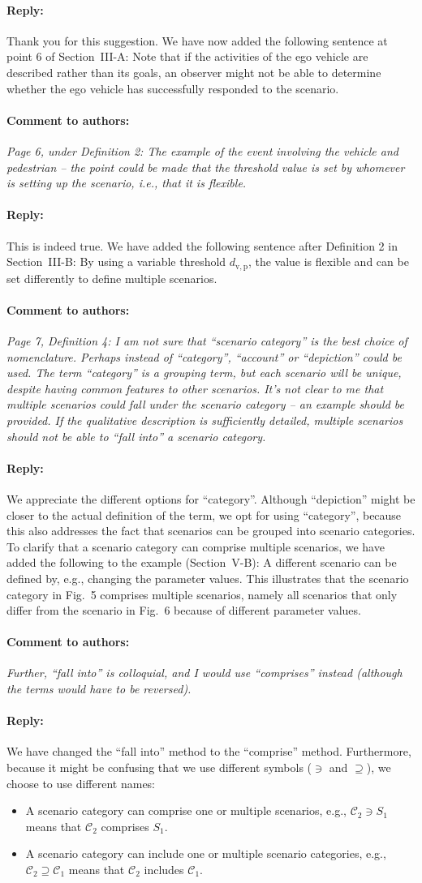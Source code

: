 \documentclass[10pt,final,a4paper,oneside,onecolumn]{article}
\newcommand{\toauthor}{\paragraph*{Comment to authors:} \itshape}
\newcommand{\fromauthor}{\paragraph*{Reply:} \normalfont}
\newcommand{\cstart}{\cbstart\color{red}}
\newcommand{\cend}{\cbend\color{black}}
\newcommand{\distancecondition}{d_{\mathrm{v,p}}}
\newcommand{\scenario}{S}
\newcommand{\scenarioa}{\scenario_{1}}
\newcommand{\comprises}{\ni}
\newcommand{\scenariocategory}{\mathcal{C}}
\newcommand{\scenariocategorya}{\scenariocategory_{1}}
\newcommand{\scenariocategoryb}{\scenariocategory_{2}}
\newcommand{\includes}{\supseteq}
\begin{document}
\fromauthor Thank you for this suggestion. We have now added the following sentence at point 6 of Section~III-A: \cstart Note that if the activities of the ego vehicle are described rather than its goals, an observer might not be able to determine whether the ego vehicle has successfully responded to the scenario.\cend



\toauthor Page 6, under Definition 2: The example of the event involving the vehicle and pedestrian -- the point could be made that the threshold value is set by whomever is setting up the scenario, i.e., that it is flexible.

\fromauthor This is indeed true. We have added the following sentence after Definition 2 in Section~III-B: \cstart By using a variable threshold $\distancecondition$, the value is flexible and can be set differently to define multiple scenarios.\cend



\toauthor Page 7, Definition 4: I am not sure that ``scenario category'' is the best choice of nomenclature. Perhaps instead of ``category'', ``account'' or ``depiction'' could be used. The term ``category'' is a grouping term, but each scenario will be unique, despite having common features to other scenarios. It's not clear to me that multiple scenarios could fall under the scenario category -- an example should be provided. If the qualitative description is sufficiently detailed, multiple scenarios should not be able to ``fall into'' a scenario category.

\fromauthor We appreciate the different options for ``category''. Although ``depiction'' might be closer to the actual definition of the term, we opt for using ``category'', because this also addresses the fact that scenarios can be grouped into scenario categories. To clarify that a scenario category can comprise multiple scenarios, we have added the following to the example (Section~V-B): \cstart A different scenario can be defined by, e.g., changing the parameter values. This illustrates that the scenario category in Fig.~5 comprises multiple scenarios, namely all scenarios that only differ from the scenario in Fig.~6 because of different parameter values.\cend

\toauthor Further, ``fall into'' is colloquial, and I would use ``comprises'' instead (although the terms would have to be reversed).

\fromauthor We have changed the ``fall into'' method to the ``\cstart comprise\cend'' method. Furthermore, because it might be confusing that we use different symbols ($\comprises$ and $\includes$), we choose to use different names:
\begin{itemize}
	\item A scenario category can \cstart comprise \cend one or multiple scenarios, e.g., $\scenariocategoryb \comprises \scenarioa$ means that $\scenariocategoryb$ \cstart comprises \cend $\scenarioa$.
	\item A scenario category can \cstart include \cend one or multiple scenario categories, e.g., $\scenariocategoryb \includes \scenariocategorya$ means that $\scenariocategoryb$ \cstart includes \cend $\scenariocategorya$.
\end{itemize}
\end{document}

